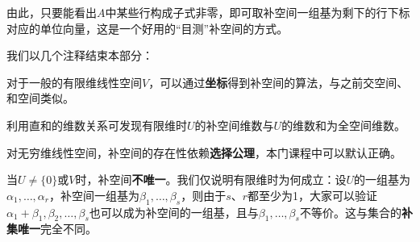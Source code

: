 \documentclass[a4paper,UTF8,fontset=windows,AutoFakeBold]{ctexart}
\newcommand*{\note}{\noindent *}
\begin{document}
\note 由此，只要能看出$A$中某些行构成子式非零，即可取补空间一组基为剩下的行下标对应的单位向量，这是一个好用的``目测''补空间的方式。

我们以几个注释结束本部分：
\begin{compactitem}
    \item 对于一般的有限维线性空间$V$，可以通过\textbf{坐标}得到补空间的算法，与之前交空间、和空间类似。
    \item 利用直和的维数关系可发现有限维时$U$的补空间维数与$U$的维数和为全空间维数。
    \item 对无穷维线性空间，补空间的存在性依赖\textbf{选择公理}，本门课程中可以默认正确。
    \item 当$U\ne\{0\}$或$V$时，补空间\textbf{不唯一}。我们仅说明有限维时为何成立：设$U$的一组基为$\alpha_1,\dots,\alpha_r$，补空间一组基为$\beta_1,\dots,\beta_s$，则由于$s$、$r$都至少为1，大家可以验证$\alpha_1+\beta_1,\beta_2,\dots,\beta_s$也可以成为补空间的一组基，且与$\beta_1,\dots,\beta_s$不等价。这与集合的\textbf{补集唯一}完全不同。
\end{compactitem}
\end{document}
